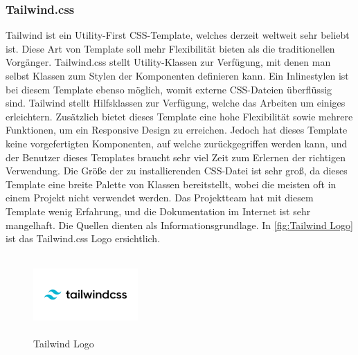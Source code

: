 \newpage
\subsubsection{Tailwind.css}
Tailwind ist ein Utility-First CSS-Template, welches derzeit weltweit sehr beliebt ist. Diese Art von Template soll mehr Flexibilität bieten als die traditionellen Vorgänger. Tailwind.css stellt Utility-Klassen zur Verfügung, mit denen man selbst Klassen zum Stylen der Komponenten definieren kann. Ein Inlinestylen ist bei diesem Template ebenso möglich, womit externe CSS-Dateien überflüssig sind. Tailwind stellt Hilfsklassen zur Verfügung, welche das Arbeiten um einiges erleichtern. Zusätzlich bietet dieses Template eine hohe Flexibilität sowie mehrere Funktionen, um ein Responsive Design zu erreichen. Jedoch hat dieses Template keine vorgefertigten Komponenten, auf welche zurückgegriffen werden kann, und der Benutzer dieses Templates braucht sehr viel Zeit zum Erlernen der richtigen Verwendung. Die Größe der zu installierenden CSS-Datei ist sehr groß, da dieses Template eine breite Palette von Klassen bereitstellt, wobei die meisten oft in einem Projekt nicht verwendet werden. Das Projektteam hat mit diesem Template wenig Erfahrung, und die Dokumentation im Internet ist sehr mangelhaft. Die Quellen \cite{Tailwind1, Tailwind2, Tailwind3} dienten als Informationsgrundlage.
 In \autoref{fig:Tailwind Logo}
ist das Tailwind.css Logo ersichtlich.
\begin{figure}[h]
	\centering
	\includegraphics[height=3cm,width=4cm]{images/Tailwind}
	\caption{Tailwind Logo}
	\label{fig:Tailwind Logo}
\end{figure}


